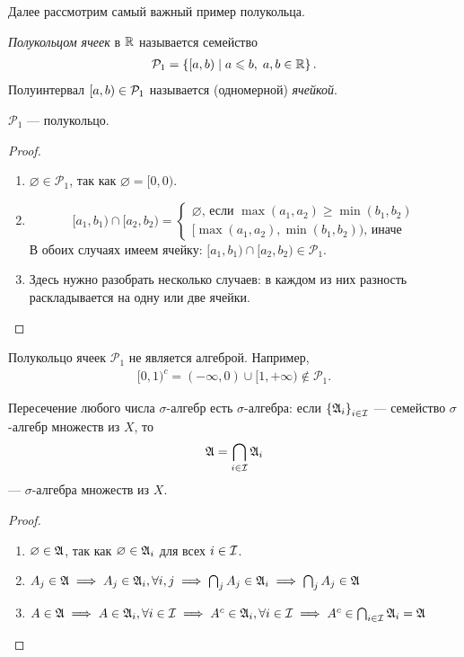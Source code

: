\documentclass[../measure-theory.tex]{subfiles}
\begin{document}
Далее рассмотрим самый важный пример полукольца.

\begin{df}
 \textit{Полукольцом ячеек} в $\mathbb{R}$ называется семейство 
 \begin{align*}
  \mathcal{P}_1 = \left\{ [a, b) \mid a \leqslant b,\; a, b \in \mathbb{R} \right\} 
 .\end{align*} Полуинтервал $[a, b) \in \mathcal{P}_1$ называется (одномерной) \textit{ячейкой}.
\end{df}
\begin{lm}
 $ \mathcal{P}_1 $ --- полукольцо.
\end{lm}
\begin{proof}\
 \begin{enumerate}
  \item $ \varnothing \in \mathcal{P}_1 $, так как $ \varnothing = [0, 0) $.
  \item $$
   [a_1, b_1) \cap [a_2, b_2) = 
   \begin{cases}
    \varnothing \text{, если } \max(a_1, a_2) \geqslant \min(b_1, b_2) \\
    [\max(a_1, a_2), \min(b_1, b_2) ) \text{, иначе}
   \end{cases}
   $$
   В обоих случаях имеем ячейку: $[a_1, b_1) \cap [a_2, b_2) \in \mathcal{P}_1 $.
  \item Здесь нужно разобрать несколько случаев: в каждом из них разность раскладывается на одну или две ячейки.
 \end{enumerate}
\end{proof}
\begin{remrk*}
 Полукольцо ячеек $ \mathcal{P}_1 $ не является алгеброй.
 Например, 
\begin{align*}
 [0, 1)^c = (-\infty, 0) \cup [1, +\infty) \not \in  \mathcal{P}_1.
\end{align*}
\end{remrk*}
\begin{lm}
 Пересечение любого числа $\sigma$-алгебр есть $\sigma$-алгебра: если $\left\{\mathfrak{A}_i\right\}_{i \in \mathcal{I}}$  --- семейство $\sigma$-алгебр множеств из $X$, то
 \begin{align*}
  \mathfrak{A} = \bigcap_{i \in \mathcal{I}} \mathfrak{A}_i
 \end{align*} --- $\sigma$-алгебра множеств из $X$.
\end{lm}
\begin{proof}\
 \begin{enumerate}
  \item $ \varnothing \in \mathfrak{A} $, так как $ \varnothing \in \mathfrak{A}_i $ для всех $ i \in \mathcal{I} $.
  \item $ A_j \in \mathfrak{A} \;\Longrightarrow\; A_j \in \mathfrak{A}_i, \forall i, j  \;\Longrightarrow\; \bigcap_j A_j \in 
   \mathfrak{A}_i \;\Longrightarrow\; \bigcap_j A_j \in \mathfrak{A}$
  \item $ A \in \mathfrak{A} \;\Longrightarrow\; A \in \mathfrak{A}_i,  \forall i \in \mathcal{I} \;\Longrightarrow\; A^c \in \mathfrak{A}_i, \forall i \in \mathcal{I} \;\Longrightarrow\; A^c \in \bigcap_{i \in \mathcal{I}} \mathfrak{A}_i = \mathfrak{A}$ 
 \end{enumerate}
\end{proof}
\end{document}
